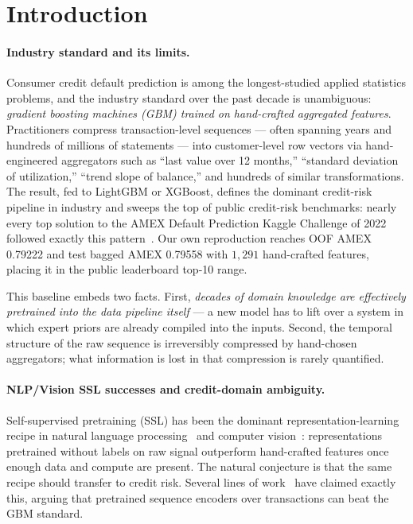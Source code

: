 \documentclass[sigconf, anonymous, review]{acmart}
\begin{document}
\section{Introduction}
\label{sec:intro}

\paragraph{Industry standard and its limits.}
Consumer credit default prediction is among the longest-studied applied
statistics problems, and the industry standard over the past decade is
unambiguous: \emph{gradient boosting machines (GBM) trained on
hand-crafted aggregated features}. Practitioners compress
transaction-level sequences --- often spanning years and hundreds of
millions of statements --- into customer-level row vectors via
hand-engineered aggregators such as ``last value over 12 months,''
``standard deviation of utilization,'' ``trend slope of balance,'' and
hundreds of similar transformations. The result, fed to LightGBM or
XGBoost, defines the dominant credit-risk pipeline in industry and
sweeps the top of public credit-risk benchmarks: nearly every top
solution to the AMEX Default Prediction Kaggle Challenge of 2022
followed exactly this pattern~\cite{AMEX_1st_place_2022}. Our own
reproduction reaches OOF AMEX 0.79222 and test bagged AMEX 0.79558
with $1{,}291$ hand-crafted features, placing it in the public
leaderboard top-10 range.

This baseline embeds two facts. First, \emph{decades of domain
knowledge are effectively pretrained into the data pipeline itself}
--- a new model has to lift over a system in which expert priors are
already compiled into the inputs. Second, the temporal structure of
the raw sequence is irreversibly compressed by hand-chosen
aggregators; what information is lost in that compression is rarely
quantified.

\paragraph{NLP/Vision SSL successes and credit-domain ambiguity.}
Self-supervised pretraining (SSL) has been the dominant
representation-learning recipe in natural language
processing~\cite{Devlin2018,Radford2018} and computer
vision~\cite{Chen2020,He2022_MAE}: representations pretrained without
labels on raw signal outperform hand-crafted features once enough data
and compute are present. The natural conjecture is that the same
recipe should transfer to credit risk. Several lines of
work~\cite{Babaev2019,Padhi2021,Skentzos2022} have claimed exactly
this, arguing that pretrained sequence encoders over transactions can
beat the GBM standard.
\end{document}
